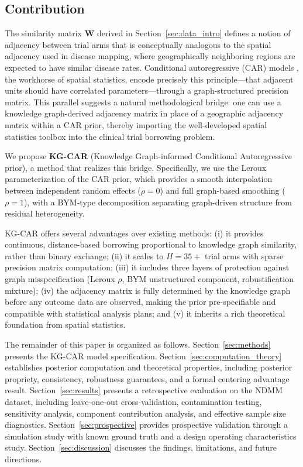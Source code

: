 \documentclass[12pt]{article}
\newcommand{\bW}{\mathbf{W}}
\begin{document}
\subsection{Contribution}

The similarity matrix $\bW$ derived in Section~\ref{sec:data_intro} defines a notion of adjacency between trial arms that is conceptually analogous to the spatial adjacency used in disease mapping, where geographically neighboring regions are expected to have similar disease rates. Conditional autoregressive (CAR) models \citep{besag1974spatial}, the workhorse of spatial statistics, encode precisely this principle---that adjacent units should have correlated parameters---through a graph-structured precision matrix. This parallel suggests a natural methodological bridge: one can use a knowledge graph-derived adjacency matrix in place of a geographic adjacency matrix within a CAR prior, thereby importing the well-developed spatial statistics toolbox into the clinical trial borrowing problem.

We propose \textbf{KG-CAR} (Knowledge Graph-informed Conditional Autoregressive prior), a method that realizes this bridge. Specifically, we use the Leroux parameterization \citep{leroux2000estimation} of the CAR prior, which provides a smooth interpolation between independent random effects ($\rho = 0$) and full graph-based smoothing ($\rho = 1$), with a BYM-type decomposition \citep{besag1991bayesian} separating graph-driven structure from residual heterogeneity.

KG-CAR offers several advantages over existing methods: (i) it provides continuous, distance-based borrowing proportional to knowledge graph similarity, rather than binary exchange; (ii) it scales to $H = 35+$ trial arms with sparse precision matrix computation; (iii) it includes three layers of protection against graph misspecification (Leroux $\rho$, BYM unstructured component, robustification mixture); (iv) the adjacency matrix is fully determined by the knowledge graph before any outcome data are observed, making the prior pre-specifiable and compatible with statistical analysis plans; and (v) it inherits a rich theoretical foundation from spatial statistics.

The remainder of this paper is organized as follows. Section~\ref{sec:methods} presents the KG-CAR model specification. Section~\ref{sec:computation_theory} establishes posterior computation and theoretical properties, including posterior propriety, consistency, robustness guarantees, and a formal centering advantage result. Section~\ref{sec:results} presents a retrospective evaluation on the NDMM dataset, including leave-one-out cross-validation, contamination testing, sensitivity analysis, component contribution analysis, and effective sample size diagnostics. Section~\ref{sec:prospective} provides prospective validation through a simulation study with known ground truth and a design operating characteristics study. Section~\ref{sec:discussion} discusses the findings, limitations, and future directions.
\end{document}
